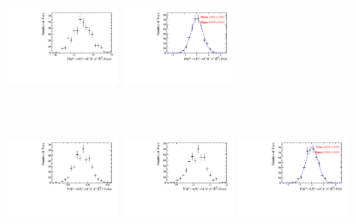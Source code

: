 \begin{figure}[!h]
\begin{subfigure}[t]{1.0\textwidth}
      \includegraphics[width=0.32\textwidth]{figs/B2DsPhi/Plots_DsKK_Error_yield_peak_DsD0_Ds2KKPi_toy_both_DsBDTbin1_PhiBDTbin1_both_both.pdf}
      \includegraphics[width=0.32\textwidth]{figs/B2DsPhi/Plots_DsKK_Pull_yield_peak_DsD0_Ds2KKPi_toy_both_DsBDTbin1_PhiBDTbin1_both_both.pdf}
      \caption{\decay{\Dsp}{\Kp\Km\pip}}
   \end{subfigure}\\
   \begin{subfigure}[t]{1.0\textwidth}
      \includegraphics[width=0.32\textwidth]{figs/B2DsPhi/Plots_DsKK_Value_yield_peak_DsD0_Ds2PiPiPi_toy_both_DsBDTbin1_PhiBDTbin1_both_both.pdf}
      \includegraphics[width=0.32\textwidth]{figs/B2DsPhi/Plots_DsKK_Error_yield_peak_DsD0_Ds2PiPiPi_toy_both_DsBDTbin1_PhiBDTbin1_both_both.pdf}
      \includegraphics[width=0.32\textwidth]{figs/B2DsPhi/Plots_DsKK_Pull_yield_peak_DsD0_Ds2PiPiPi_toy_both_DsBDTbin1_PhiBDTbin1_both_both.pdf}

\end{subfigure}
\end{figure}
